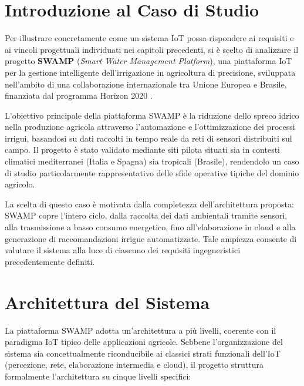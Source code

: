 \section{Introduzione al Caso di Studio}

Per illustrare concretamente come un sistema IoT possa rispondere ai requisiti e ai vincoli progettuali individuati nei capitoli precedenti, si è scelto di analizzare il progetto \textbf{SWAMP} (\textit{Smart Water Management Platform}), una piattaforma IoT per la gestione intelligente dell'irrigazione in agricoltura di precisione, sviluppata nell'ambito di una collaborazione internazionale tra Unione Europea e Brasile, finanziata dal programma Horizon 2020 \cite{kamienski2019swamp}.

L'obiettivo principale della piattaforma SWAMP è la riduzione dello spreco idrico nella produzione agricola attraverso l'automazione e l'ottimizzazione dei processi irrigui, basandosi su dati raccolti in tempo reale da reti di sensori distribuiti sul campo. Il progetto è stato validato mediante siti pilota situati sia in contesti climatici mediterranei (Italia e Spagna) sia tropicali (Brasile), rendendolo un caso di studio particolarmente rappresentativo delle sfide operative tipiche del dominio agricolo.

La scelta di questo caso è motivata dalla completezza dell'architettura proposta: SWAMP copre l'intero ciclo, dalla raccolta dei dati ambientali tramite sensori, alla trasmissione a basso consumo energetico, fino all'elaborazione in cloud e alla generazione di raccomandazioni irrigue automatizzate. Tale ampiezza consente di valutare il sistema alla luce di ciascuno dei requisiti ingegneristici precedentemente definiti.


\section{Architettura del Sistema}

La piattaforma SWAMP adotta un’architettura a più livelli, coerente con il paradigma IoT tipico delle applicazioni agricole. Sebbene l'organizzazione del sistema sia concettualmente riconducibile ai classici strati funzionali dell'IoT (percezione, rete, elaborazione intermedia e cloud), il progetto struttura formalmente l'architettura su cinque livelli specifici:

